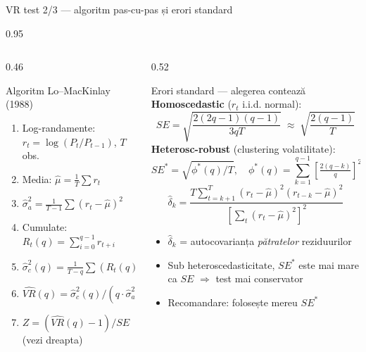 \documentclass[9pt, aspectratio=169, t]{beamer}
\begin{document}
\begin{frame}[shrink=10]{VR test 2/3 --- algoritm pas-cu-pas și erori standard}
\begin{cminipage}{0.95\textwidth}
\begin{columns}[T]
\begin{column}{0.46\textwidth}
\begin{exampleblock}{Algoritm Lo--MacKinlay (1988)}
\footnotesize
\begin{enumerate}\setlength{\itemsep}{0pt}
    \item Log-randamente: $r_t = \log(P_t/P_{t-1})$, $T$ obs.
    \item Media: $\hat\mu = \frac{1}{T}\sum r_t$
    \item $\hat\sigma^2_a = \frac{1}{T-1}\sum (r_t - \hat\mu)^2$
    \item Cumulate: $R_t(q) = \sum_{i=0}^{q-1} r_{t+i}$
    \item $\hat\sigma^2_c(q) = \frac{1}{T-q}\sum (R_t(q) - q\hat\mu)^2$
    \item $\widehat{VR}(q) = \hat\sigma^2_c(q) / (q \cdot \hat\sigma^2_a)$
    \item $Z = (\widehat{VR}(q) - 1) / SE$ \quad (vezi dreapta)
\end{enumerate}
\end{exampleblock}
\end{column}
\begin{column}{0.52\textwidth}
\begin{block}{Erori standard --- alegerea contează}
\footnotesize
\textbf{Homoscedastic} ($r_t$ i.i.d. normal):
\[
    SE = \sqrt{\frac{2(2q-1)(q-1)}{3qT}} \;\approx\; \sqrt{\frac{2(q-1)}{T}}
\]
\textbf{Heterosc-robust} (clustering volatilitate):
\[
    SE^* = \sqrt{\phi^*(q)/T}, \quad \phi^*(q) = \sum_{k=1}^{q-1} \left[\tfrac{2(q-k)}{q}\right]^2 \hat\delta_k
\]
\[
    \hat\delta_k = \frac{T \sum_{t=k+1}^T (r_t - \hat\mu)^2 (r_{t-k} - \hat\mu)^2}{\left[\sum_t (r_t - \hat\mu)^2\right]^2}
\]
\begin{itemize}\setlength{\itemsep}{0pt}
    \item $\hat\delta_k$ = autocovarianța \emph{pătratelor} reziduurilor
    \item Sub heteroscedasticitate, $SE^*$ este mai mare ca $SE$ $\Rightarrow$ test mai conservator
    \item \alert{Recomandare}: folosește mereu $SE^*$
\end{itemize}
\end{block}
\end{column}
\end{columns}
\end{cminipage}
\end{frame}
\end{document}
